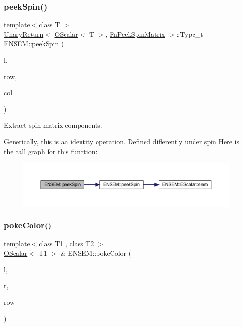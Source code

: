 \subsubsection{\texorpdfstring{peekSpin()}{peekSpin()}\hspace{0.1cm}{\footnotesize\ttfamily [2/2]}}
{\footnotesize\ttfamily template$<$class T $>$ \\
\mbox{\hyperlink{structENSEM_1_1UnaryReturn}{Unary\+Return}}$<$ \mbox{\hyperlink{classENSEM_1_1OScalar}{O\+Scalar}}$<$ T $>$, \mbox{\hyperlink{structENSEM_1_1FnPeekSpinMatrix}{Fn\+Peek\+Spin\+Matrix}} $>$\+::Type\+\_\+t E\+N\+S\+E\+M\+::peek\+Spin (\begin{DoxyParamCaption}\item[{const \mbox{\hyperlink{classENSEM_1_1OScalar}{O\+Scalar}}$<$ T $>$ \&}]{l,  }\item[{int}]{row,  }\item[{int}]{col }\end{DoxyParamCaption})\hspace{0.3cm}{\ttfamily [inline]}}



Extract spin matrix components. 

Generically, this is an identity operation. Defined differently under spin Here is the call graph for this function\+:\nopagebreak
\begin{figure}[H]
\begin{center}
\leavevmode
\includegraphics[width=350pt]{d1/d71/group__obsscalar_ga9ce0c024aa13d3c00740b9a82d2912db_cgraph}
\end{center}
\end{figure}
\mbox{\label{group__obsscalar_ga0a369092bcae6deacc6b6a1a5177ddb1}} 
\subsubsection{\texorpdfstring{pokeColor()}{pokeColor()}\hspace{0.1cm}{\footnotesize\ttfamily [1/2]}}
{\footnotesize\ttfamily template$<$class T1 , class T2 $>$ \\
\mbox{\hyperlink{classENSEM_1_1OScalar}{O\+Scalar}}$<$ T1 $>$ \& E\+N\+S\+E\+M\+::poke\+Color (\begin{DoxyParamCaption}\item[{\mbox{\hyperlink{classENSEM_1_1OScalar}{O\+Scalar}}$<$ T1 $>$ \&}]{l,  }\item[{const \mbox{\hyperlink{classENSEM_1_1OScalar}{O\+Scalar}}$<$ T2 $>$ \&}]{r,  }\item[{int}]{row }\end{DoxyParamCaption})\hspace{0.3cm}{\ttfamily [inline]}}



